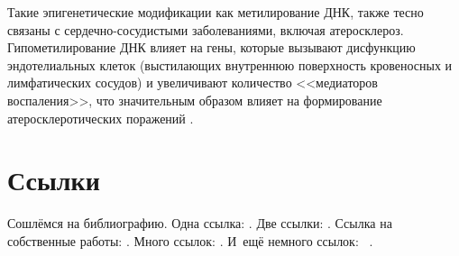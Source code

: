 Такие эпигенетические модификации как метилирование ДНК, также тесно связаны с сердечно-сосудистыми заболеваниями, включая атеросклероз. Гипометилирование ДНК влияет на гены, которые вызывают дисфункцию эндотелиальных клеток (выстилающих внутреннюю поверхность кровеносных и лимфатических сосудов) и увеличивают количество <<медиаторов воспаления>>, что значительным образом влияет на формирование атеросклеротических поражений \autocite{Castro2003}. 




\section{Ссылки}\label{sec:ch1/sec2}

Сошлёмся на библиографию.
Одна ссылка: \cite[с.~54]{Sokolov}\cite[с.~36]{Gaidaenko}.
Две ссылки: \cite{Sokolov,Gaidaenko}.
Ссылка на собственные работы: \cite{vakbib1, confbib2}.
Много ссылок: %
\cite{Lermontov, Management, Borozda, Marketing, Constitution, FamilyCode,
Gost.7.0.53, Razumovski, Lagkueva, Pokrovski, Methodology, Berestova,
Kriger}%
%
.
И~ещё немного ссылок:~\cite{Article,Book,Booklet,Conference,Inbook,Incollection,Manual,Mastersthesis,
Misc,Phdthesis,Proceedings,Techreport,Unpublished}
\cite{medvedev2006jelektronnye, CEAT:CEAT581, doi:10.1080/01932691.2010.513279,
Gosele1999161,Li2007StressAnalysis, Shoji199895, test:eisner-sample,
test:eisner-sample-shorted, AB_patent_Pomerantz_1968, iofis_patent1960}
%
.

%

